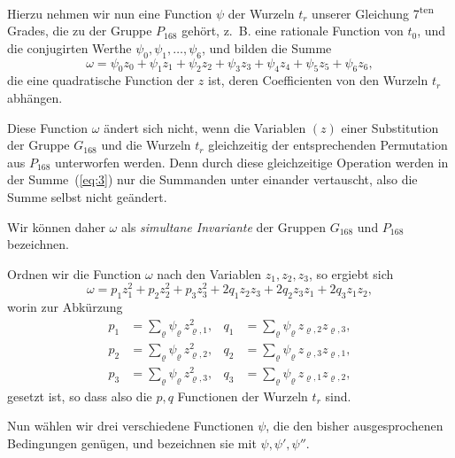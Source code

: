 \documentclass[12pt,a4paper]{article}
\theoremstyle{definition}
\begin{document}
Hierzu nehmen wir nun eine Function $\psi$ der Wurzeln $t_r$ unserer Gleichung 7\textsuperscript{ten} Grades, die zu der Gruppe $P_{168}$ gehört, z.~B. eine rationale Function von $t_0$, und die conjugirten Werthe $\psi_0,\psi_1,\dots,\psi_6$, und bilden die Summe
\begin{equation}\label{eq:3}
\omega = \psi_0 z_0 + \psi_1 z_1 + \psi_2 z_2 + \psi_3 z_3 + \psi_4 z_4 + \psi_5 z_5 + \psi_6 z_6,
\end{equation}
die eine quadratische Function der $z$ ist, deren Coefficienten von den Wurzeln $t_r$ abhängen.

Diese Function $\omega$ ändert sich nicht, wenn die Variablen $(z)$ einer Substitution der Gruppe $G_{168}$ und die Wurzeln $t_r$ gleichzeitig der entsprechenden Permutation aus $P_{168}$ unterworfen werden. Denn durch diese gleichzeitige Operation werden in der Summe~(\ref{eq:3}) nur die Summanden unter einander vertauscht, also die Summe selbst nicht geändert.

Wir können daher $\omega$ als \emph{simultane Invariante} der Gruppen $G_{168}$ und $P_{168}$ bezeichnen.

Ordnen wir die Function $\omega$ nach den Variablen $z_1,z_2,z_3$, so ergiebt sich
\begin{equation}\label{eq:4}
\omega = p_1 z_1^2 + p_2 z_2^2 + p_3 z_3^2 + 2q_1 z_2 z_3 + 2q_2 z_3 z_1 + 2q_3 z_1 z_2,
\end{equation}
worin zur Abkürzung
\begin{equation}\label{eq:5}
\begin{aligned}
p_1 &= \sum_{\varrho} \psi_{\varrho}\, z_{\varrho,1}^2, &
q_1 &= \sum_{\varrho} \psi_{\varrho}\, z_{\varrho,2} z_{\varrho,3},\\
p_2 &= \sum_{\varrho} \psi_{\varrho}\, z_{\varrho,2}^2, &
q_2 &= \sum_{\varrho} \psi_{\varrho}\, z_{\varrho,3} z_{\varrho,1},\\
p_3 &= \sum_{\varrho} \psi_{\varrho}\, z_{\varrho,3}^2, &
q_3 &= \sum_{\varrho} \psi_{\varrho}\, z_{\varrho,1} z_{\varrho,2},
\end{aligned}
\end{equation}
gesetzt ist, so dass also die $p,q$ Functionen der Wurzeln $t_r$ sind.

Nun wählen wir drei verschiedene Functionen $\psi$, die den bisher ausgesprochenen Bedingungen genügen, und bezeichnen sie mit $\psi,\psi',\psi''$.
\end{document}
